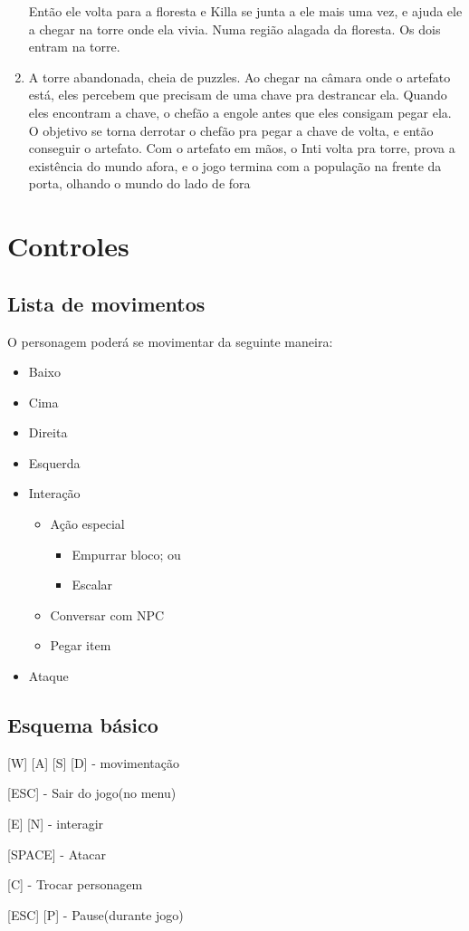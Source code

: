 \documentclass[12pt]{article}
\begin{document}
\begin{enumerate}
Então ele volta para a floresta e Killa se junta a ele mais uma vez, e ajuda ele a chegar na torre onde ela vivia. Numa região alagada da floresta. Os dois entram na torre.
\item A torre abandonada, cheia de puzzles. Ao chegar na câmara onde o artefato está, eles percebem que precisam de uma chave pra destrancar ela. Quando eles encontram a chave, o chefão a engole antes que eles consigam pegar ela. O objetivo se torna derrotar o chefão pra pegar a chave de volta, e então conseguir o artefato.
Com o artefato em mãos, o Inti volta pra torre, prova a existência do mundo afora, e o jogo termina com a população na frente da porta, olhando o mundo do lado de fora
\end{enumerate}
\section{Controles}

\subsection{Lista de movimentos}
O personagem poderá se movimentar da seguinte maneira:

\begin{itemize}
    \item Baixo
    \item Cima
    \item Direita
    \item Esquerda
    \item Interação
    \begin{itemize}
        \item Ação especial
        \begin{itemize}
            \item Empurrar bloco; ou
            \item Escalar
        \end{itemize}
        \item Conversar com NPC
        \item Pegar item
    \end{itemize}
    \item Ataque
\end{itemize}

\subsection{Esquema básico}

[W] [A] [S] [D] - movimentação

[ESC] - Sair do jogo(no menu)

[E] [N] - interagir

[SPACE] - Atacar

[C] - Trocar personagem

[ESC] [P] - Pause(durante jogo)
\end{document}
